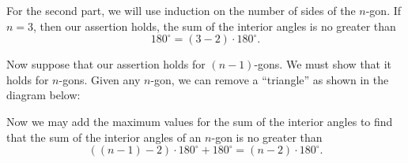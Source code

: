 \documentclass[handout]{ximera}
\begin{document}
\begin{question}
\begin{solution}
\begin{freeResponse}
For the second part, we will use induction on the number of sides of
the $n$-gon. If $n=3$, then our assertion holds, the sum of the interior angles is no greater than 
\[
180^\circ = (3-2) \cdot 180^\circ. 
\]

Now suppose that our assertion holds for $(n-1)$-gons. We must show
that it holds for $n$-gons. Given any $n$-gon, we can remove a
``triangle'' as shown in the diagram below:
\begin{image}
\end{image}
Now we may add the maximum values for the sum of the interior angles
to find that the sum of the interior angles of an $n$-gon is no
greater than
\[
((n-1)-2)\cdot 180^\circ + 180^\circ = (n-2)\cdot 180^\circ.
\]
\end{freeResponse}
\end{solution}
\end{question}
\end{document}
